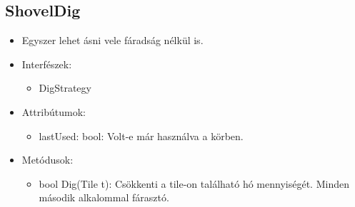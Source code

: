 \subsection{ShovelDig}
\begin{itemize}
	\item Egyszer lehet ásni vele fáradság nélkül is.
	\item Interfészek:
	\begin{itemize}
		\item DigStrategy
	\end{itemize}
	\item Attribútumok:
	\begin{itemize}
		\item lastUsed: bool: Volt-e már használva a körben.
	\end{itemize}
	\item Metódusok:
	\begin{itemize}
		\item bool Dig(Tile t): Csökkenti a tile-on található hó mennyiségét. Minden második alkalommal fárasztó.
	\end{itemize}
\end{itemize}

